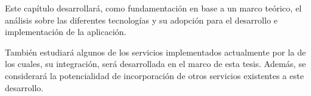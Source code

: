 Este capítulo desarrollará, como fundamentación en base a un marco teórico, el análisis sobre las diferentes tecnologías y su adopción para el desarrollo e implementación de la aplicación. 

También estudiará algunos de los servicios implementados actualmente por la \unlp  de los cuales, su integración, será desarrollada en el marco de esta tesis. Además, se considerará la potencialidad de incorporación de otros servicios existentes a este desarrollo.